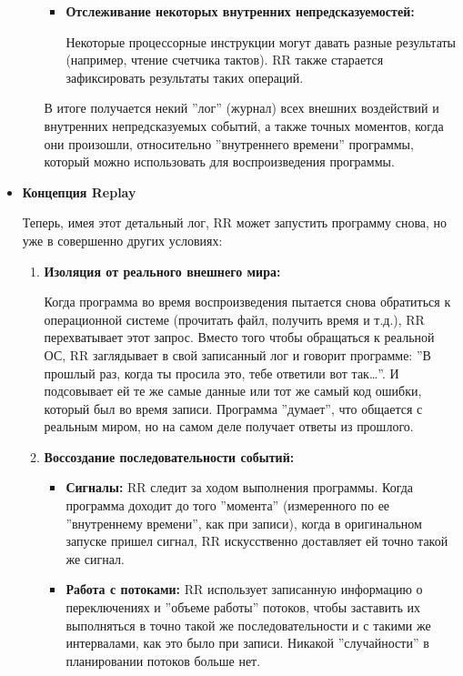 \begin{itemize}
\begin{enumerate}
\begin{itemize}
          \item \textbf{Отслеживание некоторых внутренних непредсказуемостей:}

          Некоторые процессорные инструкции могут давать разные результаты (например, чтение счетчика тактов). 
          RR также старается зафиксировать результаты таких операций.
        \end{itemize}

        В итоге получается некий ''лог'' (журнал) всех внешних воздействий и внутренних непредсказуемых событий, 
        а также точных моментов, когда они произошли, относительно ''внутреннего времени'' программы, 
        который можно использовать для воспроизведения программы.
    
    \end{enumerate}
  
  \item \textbf{Концепция Replay}

    Теперь, имея этот детальный лог, RR может запустить программу снова, но уже в совершенно других условиях:
    \begin{enumerate}

      \item \textbf{Изоляция от реального внешнего мира:} 
      
      Когда программа во время
      воспроизведения пытается снова обратиться к операционной системе (прочитать
      файл, получить время и т.д.), RR перехватывает этот запрос. Вместо того чтобы
      обращаться к реальной ОС, RR заглядывает в свой записанный лог и говорит
      программе: ''В прошлый раз, когда ты просила это, тебе ответили вот так\ldots''. И
      подсовывает ей те же самые данные или тот же самый код ошибки, который был во
      время записи. Программа ''думает'', что общается с реальным миром, но на самом
      деле получает ответы из прошлого.

      \item \textbf{Воссоздание последовательности событий:}
      
      \begin{itemize}

        \item \textbf{Сигналы:} RR следит за ходом выполнения программы. Когда программа
        доходит до того ''момента'' (измеренного по ее ''внутреннему времени'', как
        при записи), когда в оригинальном запуске пришел сигнал, RR
        искусственно доставляет ей точно такой же сигнал.

        \item \textbf{Работа с потоками:} RR использует записанную информацию о
        переключениях и ''объеме работы'' потоков, чтобы заставить их выполняться
        в точно такой же последовательности и с такими же интервалами, как это
        было при записи. Никакой ''случайности'' в планировании потоков больше
        нет.


\end{itemize}
\end{enumerate}
\end{itemize}
